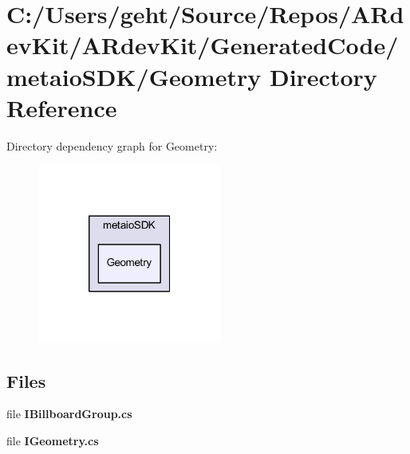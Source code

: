 \section{C\-:/\-Users/geht/\-Source/\-Repos/\-A\-Rdev\-Kit/\-A\-Rdev\-Kit/\-Generated\-Code/metaio\-S\-D\-K/\-Geometry Directory Reference}
\label{dir_c819ce971cd1b39c4581a05e46b33dcd}
Directory dependency graph for Geometry\-:
\nopagebreak
\begin{figure}[H]
\begin{center}
\leavevmode
\includegraphics[width=172pt]{dir_c819ce971cd1b39c4581a05e46b33dcd_dep}
\end{center}
\end{figure}
\subsection*{Files}
\begin{DoxyCompactItemize}
\item 
file {\bfseries I\-Billboard\-Group.\-cs}
\item 
file {\bfseries I\-Geometry.\-cs}
\end{DoxyCompactItemize}
